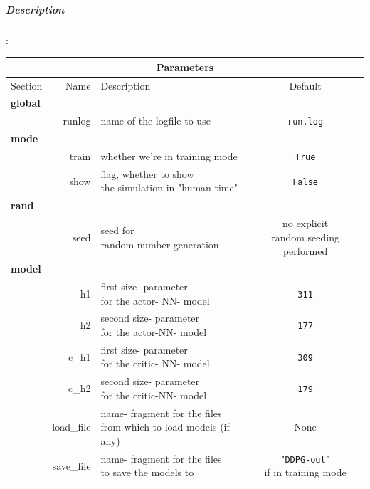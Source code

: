 \documentclass[a4paper]{article}
\begin{document}
\normalsize

\subparagraph{Description}
:\\
\small
\begin{tabular}{ |l|r|l|c| }
  \hline
  \multicolumn{4}{|c|}{Parameters} \\
  \hline
Section & Name & Description & Default \\
  \hline
\multicolumn{4}{|l|}{\textbf{global}} \\
               & runlog & name of the logfile to use & \texttt{run.log} \\
\multicolumn{4}{|l|}{\textbf{mode}} \\
               & train & whether we're in training mode & \texttt{True} \\
               & show & \makecell[tl]{flag, whether to show \\ the simulation in "human time"} & \texttt{False} \\
\multicolumn{4}{|l|}{\textbf{rand}} \\
               & seed & \makecell[tl]{seed for \\ random number generation} & \makecell[tc]{no explicit \\ random seeding performed} \\
\multicolumn{4}{|l|}{\textbf{model}} \\
               & h1 & \makecell[tl]{first size- parameter \\ for the actor- NN- model} & \texttt{311} \\
               & h2 & \makecell[tl]{second size- parameter \\ for the actor-NN- model} & \texttt{177} \\
               & c\_h1 & \makecell[tl]{first size- parameter \\ for the critic- NN- model} & \texttt{309} \\
               & c\_h2 & \makecell[tl]{second size- parameter \\ for the critic-NN- model} & \texttt{179} \\
               & load\_file & \makecell[tl]{name- fragment for the files \\ from which to load models (if any)} & None \\
               & save\_file & \makecell[tl]{name- fragment for the files \\ to save the models to} & \makecell[tc]{"\texttt{DDPG-out}" \\ if in training mode} \\

\end{tabular}
\end{document}
